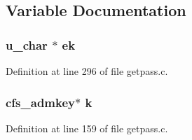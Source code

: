 \subsection{Variable Documentation}
\subsubsection{\setlength{\rightskip}{0pt plus 5cm}u\_\-char $\ast$ {\bf ek}}\label{getpass_8c_a1}




Definition at line 296 of file getpass.c.
\subsubsection{\setlength{\rightskip}{0pt plus 5cm}cfs\_\-admkey$\ast$ {\bf k}}\label{getpass_8c_a0}




Definition at line 159 of file getpass.c.
